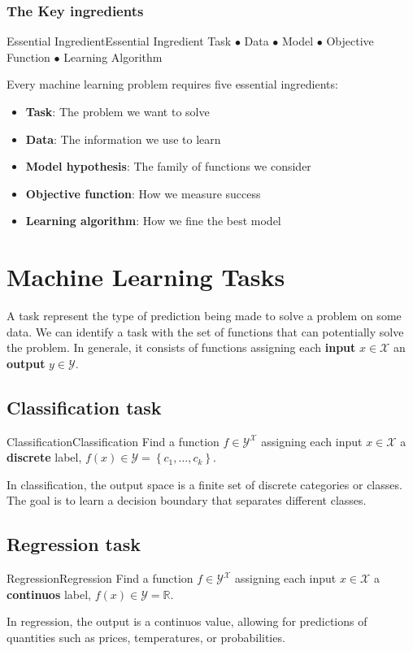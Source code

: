 \documentclass[a4paper]{article}
\theoremstyle{definition}
\begin{document}
\subsubsection{The Key ingredients}
\begin{example}{Essential Ingredient}{Essential Ingredient}
Task \( \bullet \) Data \( \bullet \) Model \( \bullet \) Objective Function \( \bullet \) Learning Algorithm 
\end{example}
Every machine learning problem requires five essential ingredients:
\begin{itemize}
    \item \textbf{Task}: The problem we want to solve 
    \item \textbf{Data}: The information we use to learn 
    \item \textbf{Model hypothesis}: The family of functions we consider 
    \item \textbf{Objective function}: How we measure success 
    \item \textbf{Learning algorithm}: How we fine the best model
\end{itemize}
\section{Machine Learning Tasks}
A task represent the type of prediction being made to solve a problem on some data. We can 
identify a task with the set of functions that can potentially solve the problem. In generale, it 
consists of functions assigning each \textbf{input} \( x \in \mathcal{X} \) an \textbf{output} \( y \in \mathcal{Y} \).
\subsection{Classification task}
\begin{definition}{Classification}{Classification}
Find a function \( f \in \mathcal{Y}^{\mathcal{X}} \) assigning each input 
    \( x \in \mathcal{X} \) a \textbf{discrete} label, \( f(x) \in \mathcal{Y} = \left\{ c_1, \ldots, c_k \right\} \).
\end{definition}
In classification, the output space is a finite set of discrete categories or classes. The goal is to learn 
a decision boundary that separates different classes.
\subsection{Regression task}
\begin{definition}{Regression}{Regression}
Find a function \( f \in \mathcal{Y}^{\mathcal{X}} \) assigning each input 
    \( x \in \mathcal{X} \) a \textbf{continuos} label, \( f(x) \in \mathcal{Y} = \mathbb{R} \).
\end{definition}
In regression, the output is a continuos value, allowing for predictions of quantities such as prices, temperatures, or probabilities.
\end{document}
